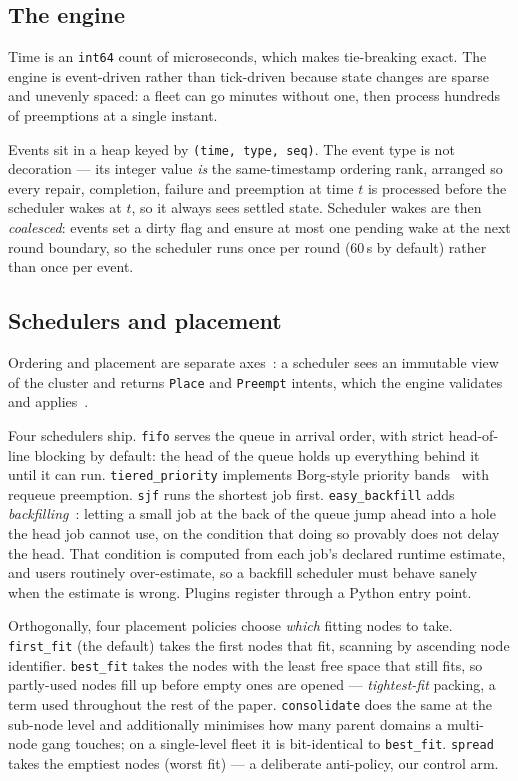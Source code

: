 \subsection{The engine}

Time is an \texttt{int64} count of microseconds, which makes tie-breaking exact.
The engine is event-driven rather than tick-driven because
state changes are sparse and unevenly spaced: a fleet can go minutes without one,
then process hundreds of preemptions at a single instant.

Events sit in a heap keyed by \texttt{(time, type, seq)}. The event type is not
decoration --- its integer value \emph{is} the same-timestamp ordering rank,
arranged so every repair, completion, failure and preemption at time $t$ is
processed before the scheduler wakes at $t$, so it always sees settled state.
Scheduler wakes are then
\emph{coalesced}: events set a dirty flag and ensure at most one pending wake at
the next round boundary, so the scheduler runs once per round (60\,s by default)
rather than once per event.

\subsection{Schedulers and placement}

Ordering and placement are separate axes~\cite{blox2024}: a scheduler sees an
immutable view of the cluster and returns \texttt{Place} and \texttt{Preempt}
intents, which the engine validates and applies~\cite{batsim2016}.

Four schedulers ship. \texttt{fifo} serves the queue in arrival order, with
strict head-of-line blocking by default: the head of the queue holds up
everything behind it until it can run. \texttt{tiered\_priority} implements
Borg-style priority bands~\cite{borg2015,borgtng2020} with requeue preemption.
\texttt{sjf} runs the shortest job first. \texttt{easy\_backfill} adds
\emph{backfilling}~\cite{easybackfill1995}: letting a small job at the back of
the queue jump ahead into a hole the head job cannot use, on the condition that
doing so provably does not delay the head. That condition is computed from each
job's declared runtime estimate, and users routinely over-estimate, so a
backfill scheduler must behave sanely when the estimate is wrong. Plugins
register through a Python entry point.

Orthogonally, four placement policies choose \emph{which} fitting nodes to take.
\texttt{first\_fit} (the default) takes the first nodes that fit, scanning by
ascending node identifier. \texttt{best\_fit} takes the nodes with the least
free space that still fits, so partly-used nodes fill up before empty ones are
opened --- \emph{tightest-fit} packing, a term used throughout the rest of the
paper. \texttt{consolidate} does the same at the sub-node level and additionally
minimises how many parent domains a multi-node gang touches; on a single-level
fleet it is bit-identical to \texttt{best\_fit}. \texttt{spread} takes the
emptiest nodes (worst fit) --- a deliberate anti-policy, our control arm.

